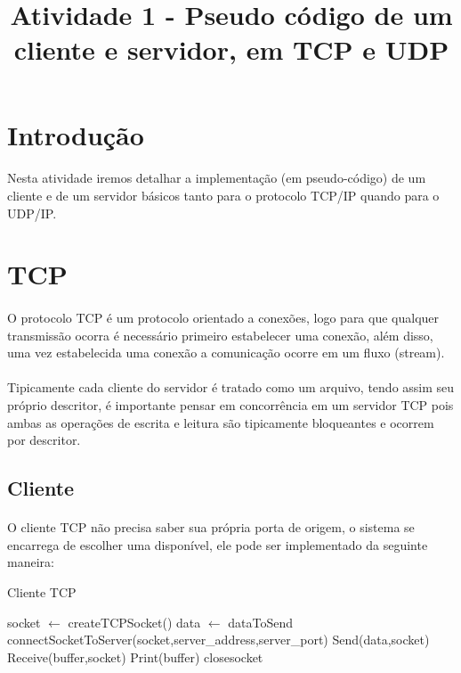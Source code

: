 \documentclass{article}
\title{Atividade 1 - Pseudo código de um cliente e servidor, em TCP e UDP}
\author{ }
\date{}
\newcommand*\Let[2]{\State #1 $\gets$ #2}
\begin{document}
\maketitle
\section{Introdução}
\paragraph{} Nesta atividade iremos detalhar a implementação (em pseudo-código) de um cliente e
de um servidor básicos tanto para o protocolo TCP/IP quando para o UDP/IP.
\section*{TCP}
\paragraph{} O protocolo TCP é um protocolo orientado a conexões, logo para que qualquer transmissão ocorra
é necessário primeiro estabelecer uma conexão, além disso, uma vez estabelecida uma conexão a comunicação
ocorre em um fluxo (stream).
\paragraph{} Tipicamente cada cliente do servidor é tratado como um arquivo, tendo assim seu próprio descritor,
é importante pensar em concorrência em um servidor TCP pois ambas as operações de escrita e leitura são
tipicamente bloqueantes e ocorrem por descritor.

\subsection{Cliente}
\paragraph{} O cliente TCP não precisa saber sua própria porta de origem, o sistema
se encarrega de escolher uma disponível, ele pode ser implementado da seguinte maneira:
\begin{algorithm}
  \caption{Cliente TCP
    \label{alg:cliente-tcp}}
  \begin{algorithmic}[1]
    \Statex
    \Function{}{}
    \Let{socket}{createTCPSocket()} 
    \Let{data}{dataToSend}
    \State connectSocketToServer(socket,server\_address,server\_port)
    \State Send(data,socket)
    \State Receive(buffer,socket)
    \State Print(buffer)
    \State close{socket}
      \EndFunction
  \end{algorithmic}
\end{algorithm}
\end{document}
